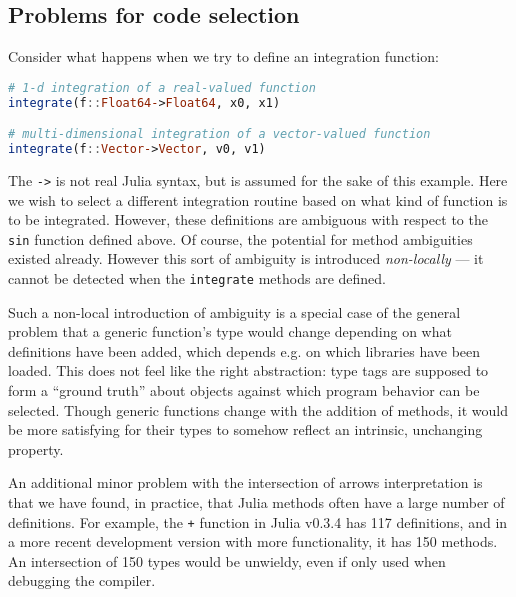 \subsection{Problems for code selection}

Consider what happens when we try to define an integration function:

\begin{singlespace}
\begin{lstlisting}[language=julia]
# 1-d integration of a real-valued function
integrate(f::Float64->Float64, x0, x1)

# multi-dimensional integration of a vector-valued function
integrate(f::Vector->Vector, v0, v1)
\end{lstlisting}
\end{singlespace}

\noindent
The \texttt{->} is not real Julia syntax, but is assumed for the sake of
this example.
Here we wish to select a different integration routine based on what
kind of function is to be integrated.
However, these definitions are ambiguous with respect to the \texttt{sin}
function defined above.
Of course, the potential for method ambiguities existed already.
However this sort of ambiguity is introduced \emph{non-locally} ---
it cannot be detected when the \texttt{integrate} methods are defined.


Such a non-local introduction of ambiguity is a special case of the
general problem that a generic function's type would change depending
on what definitions have been added, which depends e.g. on which libraries
have been loaded. This does not feel like the right abstraction:
type tags are supposed to form a ``ground truth'' about objects against
which program behavior can be selected. Though generic functions change
with the addition of methods, it would be more satisfying for their
types to somehow reflect an intrinsic, unchanging property.

An additional minor problem with the intersection of arrows
interpretation is that we have found, in practice, that Julia methods
often have a large number of definitions. For example, the \texttt{+}
function in Julia v0.3.4 has 117 definitions, and in a more recent
development version with more functionality, it has 150 methods. An
intersection of 150 types would be unwieldy, even if only
used when debugging the compiler.


